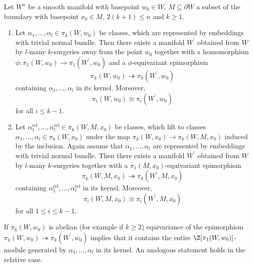 \begin{proposition}
    \label{appendix:prop:surger_killer}
    Let $W^n$ be a smooth manifold with basepoint $w_0 \in W$, $M \subseteq \partial W$ a subset of the boundary with basepoint $x_0 \in M$, $2(k+1) \leq n$ and $k \geq 1$.
    \begin{enumerate}[label=(\roman*)]
        \item \label{appendix:eq:surgery_killer_absolute_version} Let $\alpha_1,\ldots,\alpha_l \in \pi_k(W,w_0)$ be classes, which are represented by embeddings with trivial normal bundle. Then there exists a manifold $W^\prime$ obtained from $W$ by $l$-many $k$-surgeries away from the point $w_0$ together with a homomorphism $\phi \colon \pi_1(W,w_0) \to \pi_1(W^\prime,w_0)$ and a $\phi$-equivariant epimorphism
        \[
        \pi_k(W,w_0) \twoheadrightarrow \pi_k(W^\prime,w_0)
        \]
        containing $\alpha_1,\ldots,\alpha_l$ in its kernel. Moreover, 
        \[
        \pi_i(W,w_0) \cong \pi_i(W^\prime,w_0)
        \] 
        for all $i \leq k-1$.
        \item \label{appendix:eq:surgery_killer_relative_version} Let $\alpha_1^\mathrm{rel},\ldots,\alpha_l^\mathrm{rel} \in \pi_k(W,M,x_0)$ be classes, which lift to classes $\alpha_1,\ldots,\alpha_l \in \pi_k(W,x_0)$ under the map $\pi_k(W,x_0) \to \pi_k(W,M,x_0)$ induced by the inclusion. Again assume that $\alpha_1,\ldots,\alpha_l$ are represented by embeddings with trivial normal bundle. Then there exists a manifold $W^\prime$ obtained from $W$ by $l$-many $k$-surgeries together with a $\pi_1(M,x_0)$-equivariant epimorphism
        \[
        \pi_k(W,M,x_0) \twoheadrightarrow \pi_k(W^\prime,M,x_0)
        \]
        containing $\alpha_1^\mathrm{rel},\ldots,\alpha_l^\mathrm{rel}$ in its kernel. Moreover, 
        \[
        \pi_i(W,M,x_0) \cong \pi_i(W^\prime,M,x_0)
        \] 
        for all $1 \leq i \leq k-1$.
    \end{enumerate}
\end{proposition}

\begin{remark}
    \label{appendix:rem:zpi_module_in_kernel}
    If $\pi_k(W,w_0)$ is abelian (for example if $k \geq 2$) equivariance of the epimorphism $\pi_k(W,w_0) \twoheadrightarrow \pi_k(W^\prime,w_0)$ implies that it contains the entire $\Z[\pi_1(W,w_0)]$-module generated by $\alpha_1,\ldots,\alpha_l$ in its kernel. An analogous statement holds in the relative case. 
\end{remark}

